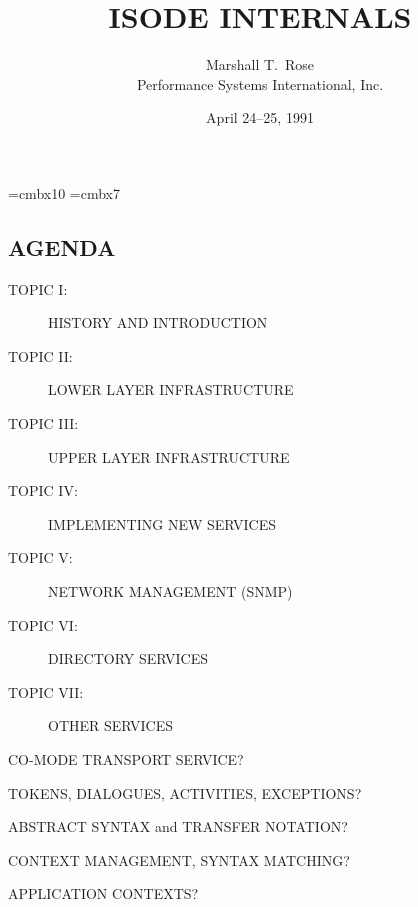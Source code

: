 

\def\emph#1{\underline{#1}}

\font\xx=cmbx10
\font\yy=cmbx7

\raggedright


\let\tradeNAMfont=\relax
\let\tradeORGfont=\relax





\title	{ISODE INTERNALS}
\author	{Marshall T.~Rose\\ Performance Systems International, Inc.}
\date	{April 24--25, 1991}
\maketitlepage


\begin{bwslide}\thispagestyle{empty}
\part*	{AGENDA}\bf

\begin{description}
\item[TOPIC I:]		HISTORY AND INTRODUCTION

\item[TOPIC II:]	LOWER LAYER INFRASTRUCTURE

\item[TOPIC III:]	UPPER LAYER INFRASTRUCTURE

\item[TOPIC IV:]	IMPLEMENTING NEW SERVICES

\item[TOPIC V:]		NETWORK MANAGEMENT (SNMP)

\item[TOPIC VI:]	DIRECTORY SERVICES

\item[TOPIC VII:]	OTHER SERVICES
\end{description}
\end{bwslide}


\setcounter{slide}{0}
\begin{bwslide}

\begin{nrtc}
\item	CO-MODE TRANSPORT SERVICE?

\item	TOKENS, DIALOGUES, ACTIVITIES, EXCEPTIONS?

\item	ABSTRACT SYNTAX and TRANSFER NOTATION?

\item	CONTEXT MANAGEMENT, SYNTAX MATCHING?

\item	APPLICATION CONTEXTS?
\end{nrtc}
\end{bwslide}


